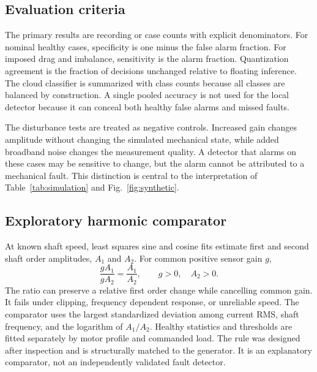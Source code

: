 \documentclass[10pt,twocolumn]{article}
\begin{document}
\subsection{Evaluation criteria}
The primary results are recording or case counts with explicit denominators. For nominal healthy cases, specificity is one minus the false alarm fraction. For imposed drag and imbalance, sensitivity is the alarm fraction. Quantization agreement is the fraction of decisions unchanged relative to floating inference. The cloud classifier is summarized with class counts because all classes are balanced by construction. A single pooled accuracy is not used for the local detector because it can conceal both healthy false alarms and missed faults.

The disturbance tests are treated as negative controls. Increased gain changes amplitude without changing the simulated mechanical state, while added broadband noise changes the measurement quality. A detector that alarms on these cases may be sensitive to change, but the alarm cannot be attributed to a mechanical fault. This distinction is central to the interpretation of Table~\ref{tab:simulation} and Fig.~\ref{fig:synthetic}.

\subsection{Exploratory harmonic comparator}
At known shaft speed, least squares sine and cosine fits estimate first and second shaft order amplitudes, $A_1$ and $A_2$. For common positive sensor gain $g$,
\begin{equation}
\frac{gA_1}{gA_2}=\frac{A_1}{A_2},\qquad g>0,\quad A_2>0.
\label{eq:ratio}
\end{equation}
The ratio can preserve a relative first order change while cancelling common gain. It fails under clipping, frequency dependent response, or unreliable speed. The comparator uses the largest standardized deviation among current RMS, shaft frequency, and the logarithm of $A_1/A_2$. Healthy statistics and thresholds are fitted separately by motor profile and commanded load. The rule was designed after inspection and is structurally matched to the generator. It is an explanatory comparator, not an independently validated fault detector.
\end{document}
